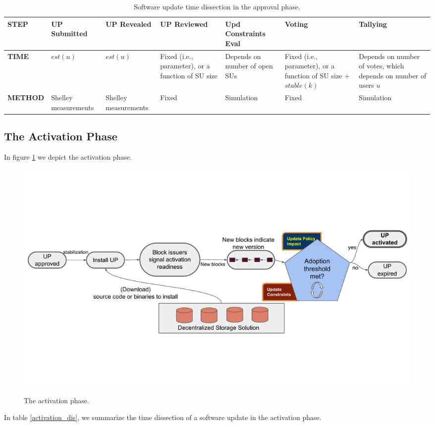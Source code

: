 \begin{table} [h!]
\centering
\begin{tabu} to 1.0\textwidth {||X[c] | X[c] | X[l] | X[l] | X[l] | X[l] | X[l] ||}
\hline
\textbf{STEP} & UP Submitted & UP Revealed & UP Reviewed & Upd Constraints Eval & Voting & Tallying \\
\hline
\hline
\textbf{TIME} & $est(u)$ & $est(u)$ & Fixed (i.e., parameter), or a function of SU size & Depends on number of open SUs & Fixed (i.e., parameter), or a function of SU size + $stable(k)$ & Depends on number of votes, which depends on number of users $u$ \\
\hline
\textbf{METHOD} & Shelley measurements & Shelley measurements & Fixed & Simulation & Fixed & Simulation \\
\hline
\end{tabu}
\caption{Software update time dissection in the approval phase.}
\label{approval_dis}
\end{table}


\subsection{The Activation Phase}

In figure \ref{activation} we depict the activation phase.

\begin{figure}[h!]
    \caption{The activation phase.}
    \centering
    \includegraphics[width=1.0 \columnwidth,keepaspectratio]{figures/activation_phase.pdf}
    \label{activation}
\end{figure}

In table \ref{activation_dis}, we summarize the time dissection of a software update in the activation phase.


